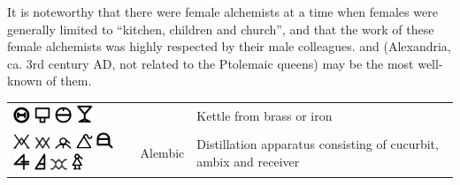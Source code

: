 \documentclass[british,final,landscape]{scrartcl}
\begin{document}
\begin{refsection}
It is noteworthy that there were female alchemists at a time when females were generally limited to ``kitchen, children and church'', and that the work of these female alchemists was highly respected by their male colleagues.  and  (Alexandria, ca. 3rd century AD, not related to the Ptolemaic queens) may be the most well-known of them.

 \tablelasttail{\bottomrule}
 \begin{supertabular}{p{0.3\textwidth}p{0.34\textwidth}p{0.34\textwidth}}
   \includegraphics[width=5mm]{Tools/Ahenum} \includegraphics[width=5mm]{Tools/Ahenum2} \includegraphics[width=5mm]{Tools/Ahenum3} \includegraphics[width=5mm]{Tools/Ahenum4} &  & Kettle from brass or iron\\
   \includegraphics[width=5mm]{Tools/Alembic} \includegraphics[width=5mm]{Tools/Alembic2} \includegraphics[width=5mm]{Tools/Alembic3} \includegraphics[width=5mm]{Tools/Alembic4} \includegraphics[width=5mm]{Tools/Alembic5} \includegraphics[width=5mm]{Tools/Alembic6} \includegraphics[height=5mm]{Tools/Alembic7} \includegraphics[width=5mm]{Tools/Alembic8} \includegraphics[height=5mm]{Tools/Alembic9} & Alembic & Distillation apparatus consisting of cucurbit, ambix and receiver \\

\end{supertabular}
\end{refsection}
\end{document}
